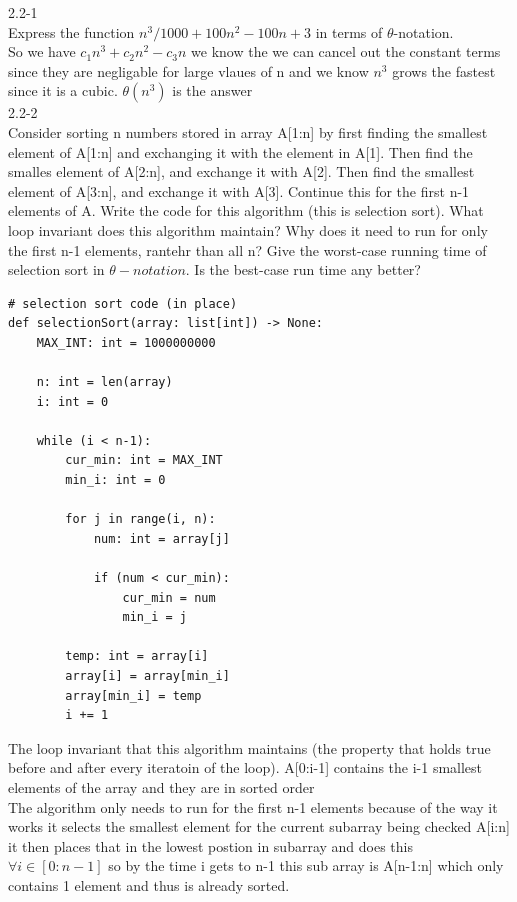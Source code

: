 2.2-1 \\
Express the function $n^3/1000 + 100n^2 - 100n + 3$ in terms of $\theta$-notation. \\

So we have $c_1n^3 + c_2n^2 - c_3n$ we know the we can cancel out the constant terms since
they are negligable for large vlaues of n and we know $n^3$ grows the fastest since 
it is a cubic. $\theta(n^3)$ is the answer \\

2.2-2 \\
Consider sorting n numbers stored in array A[1:n] by first finding the smallest element of A[1:n]
and exchanging it with the element in A[1]. Then find the smalles element of A[2:n], and exchange it with A[2]. 
Then find the smallest element of A[3:n], and exchange it with A[3]. Continue this for the first n-1 elements of A.
Write the code for this algorithm (this is selection sort). What loop invariant does this algorithm maintain? Why does it need
to run for only the first n-1 elements, rantehr than all n? Give the worst-case running time of selection sort in $\theta -notation$. Is the best-case
run time any better? \\

\begin{verbatim}
# selection sort code (in place)
def selectionSort(array: list[int]) -> None:
    MAX_INT: int = 1000000000
    
    n: int = len(array)
    i: int = 0
    
    while (i < n-1):
        cur_min: int = MAX_INT
        min_i: int = 0
        
        for j in range(i, n):
            num: int = array[j]
            
            if (num < cur_min):
                cur_min = num
                min_i = j
        
        temp: int = array[i]
        array[i] = array[min_i]
        array[min_i] = temp
        i += 1
\end{verbatim}

The loop invariant that this algorithm maintains (the property that holds true before and after every iteratoin of the loop).
A[0:i-1] contains the i-1 smallest elements of the array and they are in sorted order \\

The algorithm only needs to run for the first n-1 elements because of the way it works
it selects the smallest element for the current subarray being checked A[i:n] it then places that in the lowest postion 
in subarray and does this $\forall i \in [0:n-1]$ so by the time i gets to n-1 this sub array is A[n-1:n] which only contains
1 element and thus is already sorted. \\

